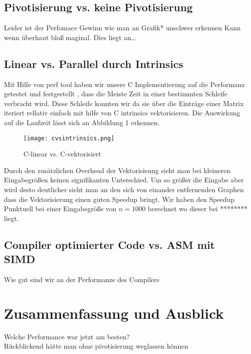 \documentclass[course=erap]{aspdoc}
\begin{document}
\subsection{Pivotisierung vs. keine Pivotisierung}
Leider ist der Perfomace Gewinn wie man an Grafik* unschwer erkennen Kann wenn überhaut bloß maginal. Dies liegt an\ldots\\

\subsection{Linear vs. Parallel durch Intrinsics}
Mit Hilfe von perf tool haben wir unsere C Implementierung auf die Performanz getestet und festgestellt , dass die Meiste Zeit in einer bestimmten Schleife verbracht wird.
 Diese Schleife konnten wir da sie über die Einträge einer Matrix iteriert rellativ einfach mit hilfe von C intrinsics vektorisieren. Die Auswirkung auf die Laufzeit lässt sich an Abbildung 1 erkennen.

 \begin{figure}[h]
\label{fig:perf1}
\caption{C-linear vs. C-vektorisiert}
 \centering
 \texttt{[image: cvsintrinsics.png]}
 
\end{figure}
Durch den zusätzlichen Overhead der Vektorisieung sieht man bei kleineren Eingabegrößen keinen signifikanten Unterschied. Um so größer die Eingabe aber wird desto deutlicher sieht man an den sich von einander entfernenden Graphen dass die Vektorisierung einen guten Speedup bringt. 
Wir haben den Speedup Punktuell bei einer Eingabegröße von $n = 1000$ berechnet wo dieser bei ******** liegt.\\

 \subsection{Compiler optimierter Code vs. ASM mit SIMD}

Wie gut sind wir an der Performanze des Compilers




\section{Zusammenfassung und Ausblick}
Welche Performance war jetzt am besten?\\
Rückblickend hätte man ohne pivotisierung weglassen können\\

{}
\end{document}
